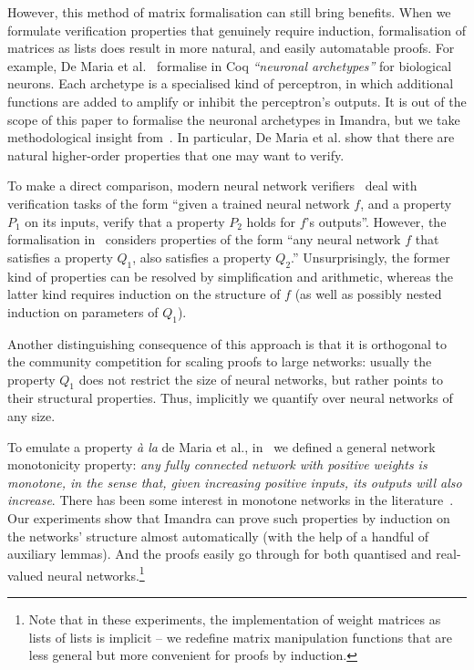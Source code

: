 \documentclass[runningheads]{llncs}
\begin{document}
However, this method of matrix formalisation can still bring benefits. When
we formulate verification properties that genuinely require induction,
formalisation of matrices as lists does result in more natural, and easily
automatable proofs. For example, De Maria et al.~\cite{MariaBLFGRG22} formalise
in Coq \emph{``neuronal archetypes''} for biological neurons. Each archetype is
a specialised kind of perceptron, in which additional functions are added to
amplify or inhibit the perceptron's outputs. It is out of the scope of this paper to
formalise the neuronal archetypes in Imandra, but we take methodological insight
from~\cite{MariaBLFGRG22}. In particular, De Maria et al. show that there
are natural higher-order properties that one may want to verify.

To make a direct comparison, modern neural network
verifiers~\cite{KaBaDiJuKo17Reluplex,SinghGPV19} deal with verification tasks of
the form ``given a trained neural network $f$, and a property $P_1$ on its
inputs, verify that a property $P_2$ holds for $f$'s outputs''. However, the
formalisation in~\cite{MariaBLFGRG22} considers properties of the form ``any
neural network $f$ that satisfies a property $Q_1$, also satisfies a property
$Q_2$.'' Unsurprisingly, the former kind of properties can be resolved by
simplification and arithmetic, whereas the latter kind requires
induction on the structure of $f$ (as well as possibly nested induction on
parameters of $Q_1$).

Another distinguishing consequence of this approach is that it is orthogonal to
the community competition for scaling proofs to large networks: usually the
property $Q_1$ does not restrict the size of neural networks, but rather points
to their structural properties. Thus, implicitly we quantify over neural
networks of any size.

To emulate a property \emph{\`a la} de Maria et al.,  in~\cite{DPKD22} we  defined a general network monotonicity property: \emph{any fully connected
network with positive weights is \emph{monotone}, in the sense that, given
increasing positive inputs, its outputs will also increase}. There has been some
interest in monotone networks in the literature~\cite{JS98,WehenkelL19}.
Our experiments show that Imandra can prove such properties by induction on the networks'
structure almost automatically (with the help of a handful of auxiliary lemmas). And the proofs easily go through for both quantised and real-valued neural networks.\footnote{Note that in these experiments, the implementation of weight matrices as lists of lists is implicit -- we redefine matrix manipulation functions that are less general but more convenient for proofs by induction.}
\end{document}
